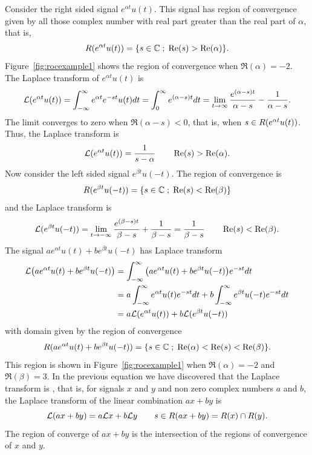 Consider the right sided signal $e^{ \alpha t}u(t)$.  This signal has region of convergence given by all those complex number with real part greater than the real part of $\alpha$, that is,
\[
R(e^{ \alpha t}u(t)) = \{ s \in {\mathbb C} \; ; \; \operatorname{Re}(s) > \operatorname{Re}(\alpha) \}.
\]
Figure~\ref{fig:rocexample1} shows the region of convergence when $\Re(\alpha) = -2$.  The Laplace transform of $e^{ \alpha t}u(t)$ is
\begin{align*}
\mathcal L(e^{ \alpha t}u(t)) = \int_{-\infty}^{\infty} e^{ \alpha t} e^{-st} u(t) dt = \int_{0}^{\infty} e^{(\alpha - s)t} dt = \lim_{t\rightarrow\infty}\frac{e^{(\alpha-s)t}}{\alpha - s} - \frac{1}{\alpha-s}.
\end{align*}
The limit converges to zero when $\Re(\alpha - s) < 0$, that is, when $s \in R(e^{ \alpha t}u(t))$.  Thus, the Laplace transform is
\[
\mathcal L(e^{ \alpha t}u(t)) = \frac{1}{s-\alpha} \qquad \operatorname{Re}(s) > \operatorname{Re}(\alpha).
\]
Now consider the left sided signal $e^{\beta t}u(-t)$.  The region of convergence is 
\[
R(e^{ \beta t}u(-t)) = \{ s \in {\mathbb C} \; ; \;  \operatorname{Re}(s) < \operatorname{Re}(\beta) \}
\]
and the Laplace transform is
\[
\mathcal L(e^{\beta t}u(-t)) = \lim_{t\rightarrow -\infty}\frac{e^{(\beta-s)t}}{\beta - s} + \frac{1}{\beta-s} = \frac{1}{\beta-s} \qquad \operatorname{Re}(s) < \operatorname{Re}(\beta).
\]
The signal $a e^{ \alpha t}u(t) + b e^{\beta t}u(-t)$ has Laplace transform
\begin{align*}
\mathcal L\big( a e^{ \alpha t}u(t) + b e^{\beta t}u(-t) \big) &= \int_{-\infty}^{\infty} \big( a e^{ \alpha t}u(t) + b e^{\beta t}u(-t) \big) e^{-st} dt \\
&= a \int_{-\infty}^{\infty} e^{ \alpha t}u(t) e^{-st} dt + b\int_{-\infty}^{\infty} e^{\beta t}u(-t)  e^{-st} dt \\
&= a \mathcal L(e^{ \alpha t}u(t)) + b\mathcal L(e^{\beta t}u(-t))
\end{align*}
with domain given by the region of convergence
\[
R(a e^{ \alpha t}u(t) + b e^{\beta t}u(-t)) = \{ s \in {\mathbb C} \; ; \;  \operatorname{Re}(\alpha) < \operatorname{Re}(s) < \operatorname{Re}(\beta) \}.
\] 
This region is shown in Figure~\ref{fig:rocexample1} when $\Re(\alpha) = -2$ and $\Re(\beta)=3$.   In the previous equation we have discovered that the Laplace transform is , that is, for signals $x$ and $y$ and non zero complex numbers $a$ and $b$, the Laplace transform of the linear combination $ax + by$ is
\begin{equation}\label{eq:laplacetransislinear}
\mathcal L(ax + by) = a\mathcal L x + b\mathcal L y \qquad s \in R(ax + by) = R(x) \cap R(y).
\end{equation}
The region of converge of $ax + by$ is the intersection of the regions of convergence of $x$ and $y$.

